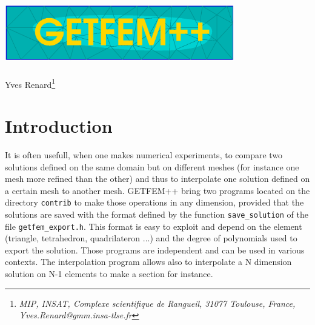 \documentclass[11pt,a4paper]{article}
\begin{document}
\begin{center}
  \includegraphics[width=10cm,angle=0]{getfem_logo.eps}\\[2cm]
   \\[0.5cm]
  { \large Yves \sc Renard\footnote{ \it MIP, INSAT, Complexe scientifique de Rangueil, 31077 Toulouse, France, Yves.Renard@gmm.insa-tlse.fr } } \\[1.0cm]
\end{center}




\section*{Introduction}

It is often usefull, when one makes numerical experiments, to compare two solutions defined on the same domain but on different meshes (for instance one mesh more refined than the other) and thus to interpolate one solution defined on a certain mesh to another mesh. GETFEM++ bring two programs located on the directory {\tt contrib} to make those operations in any dimension, provided that the solutions are saved with the format defined by the function {\tt save\_solution} of the file {\tt getfem\_export.h}. This format is easy to exploit and depend on the element (triangle, tetrahedron, quadrilateron ...) and the degree of polynomials used to export the solution. Those programs are independent and can be used in various contexts. The interpolation program allows also to interpolate a N dimension solution on N-1 elements to make a section for instance.\\[5cm]

\newpage
\end{document}
